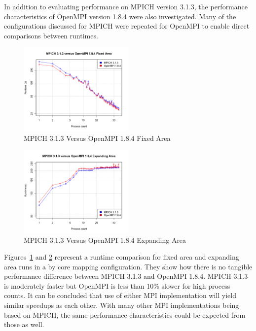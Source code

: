 In addition to evaluating performance on MPICH version 3.1.3, the performance
characteristics of OpenMPI version 1.8.4 were also investigated. Many of the
configurations discussed for MPICH were repeated for OpenMPI to enable direct
comparisons between runtimes.

\begin{figure}[h]
    \includegraphics[width=0.5\textwidth]
    {graphs/MPICH313-OpenMPI184-fixed-area.png}
    \caption{MPICH 3.1.3 Versus OpenMPI 1.8.4 Fixed Area}
    \label{fig:mpichversusopenmpifixedarea}
\end{figure}

\begin{figure}[h]
    \includegraphics[width=0.5\textwidth]
    {graphs/MPICH313-OpenMPI184-expanding-area.png}
    \caption{MPICH 3.1.3 Versus OpenMPI 1.8.4 Expanding Area}
    \label{fig:mpichversusopenmpiexpandingarea}
\end{figure}

Figures~\ref{fig:mpichversusopenmpifixedarea} and
\ref{fig:mpichversusopenmpiexpandingarea} represent a runtime comparison for
fixed area and expanding area runs in a by core mapping configuration. They show
how there is no tangible performance difference between MPICH 3.1.3 and OpenMPI
1.8.4. MPICH 3.1.3 is moderately faster but OpenMPI is less than 10\% slower for
high process counts. It can be concluded that use of either MPI implementation
will yield similar speedups as each other. With many other MPI implementations
being based on MPICH, the same performance characteristics could be expected
from those as well.
